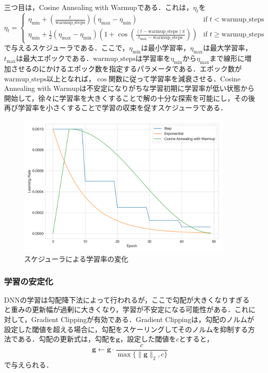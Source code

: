 \documentclass[12pt]{jarticle}
\numberwithin{equation}{section}    %
\numberwithin{figure}{section}      %
\numberwithin{table}{section}      %
\begin{document}
三つ目は，Cosine Annealing with Warmupである．これは，$\eta_{t}$を
\begin{equation}
    \eta_{t} =
    \begin{cases}
        \eta_{\text{min}} + \left( \frac{t}{\text{warmup\_steps}} \right) (\eta_{\text{max}} - \eta_{\text{min}})                                                                                  & \text{if $t < \text{warmup\_steps}$}   \\
        \eta_{\text{min}} + \frac{1}{2} (\eta_{\text{max}} - \eta_{\text{min}}) \left( 1 + \cos \left( \frac{(t - \text{warmup\_steps})\pi}{t_{\text{max}} - \text{warmup\_steps}} \right) \right) & \text{if $t \ge \text{warmup\_steps}$}
    \end{cases}
\end{equation}
で与えるスケジューラである．ここで，$\eta_{\text{min}}$は最小学習率，$\eta_{\text{max}}$は最大学習率，$t_{\text{max}}$は最大エポックである．$\text{warmup\_steps}$は学習率を$\eta_{\text{min}}$から$\eta_{\text{max}}$まで線形に増加させるのにかけるエポック数を指定するパラメータである．エポック数が$\text{warmup\_steps}$以上となれば，$\cos$関数に従って学習率を減衰させる．Cosine Annealing with Warmupは不安定になりがちな学習初期に学習率が低い状態から開始して，徐々に学習率を大きくすることで解の十分な探索を可能にし，その後再び学習率を小さくすることで学習の収束を促すスケジューラである．

\begin{figure}[bt]
    \centering
    \includegraphics[height=70mm]{./figure/sec3/lr_scheduler.png}
    \caption{スケジューラによる学習率の変化}
    \label{sec3:fig:lr_scheduler}
\end{figure}

\subsubsection{学習の安定化}
DNNの学習は勾配降下法によって行われるが，ここで勾配が大きくなりすぎると重みの更新幅が過剰に大きくなり，学習が不安定になる可能性がある．これに対して，Gradient Clippingが有効である．Gradient Clippingは，勾配のノルムが設定した閾値を超える場合に，勾配をスケーリングしてそのノルムを抑制する方法である．勾配の更新式は，勾配を$\bm{g}$，設定した閾値を$c$とすると，
\begin{equation}
    \bm{g} \gets \bm{g} \cdot \frac{c}{\max \{\|\bm{g}\|_{2}, c\}}
\end{equation}
で与えられる．
\end{document}
